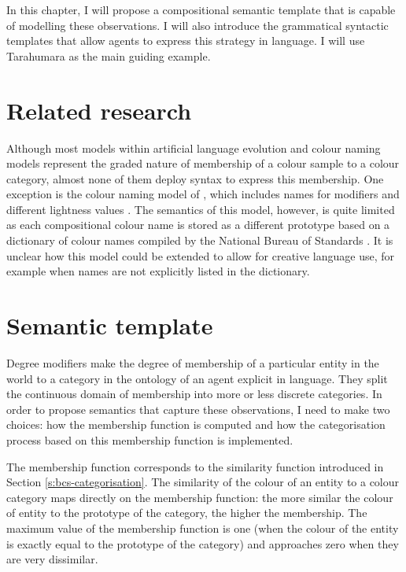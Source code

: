 In this chapter, I will propose a compositional semantic template that
is capable of modelling these observations. I will also introduce the
grammatical syntactic templates that allow agents to express this
strategy in language. I will use Tarahumara as the main guiding
example.

\section{Related research}
\label{s:gms-related-research}

Although most models within artificial language evolution and colour
naming models represent the graded nature of membership of a colour
sample to a colour category, almost none of them deploy syntax to
express this membership. One exception is the colour naming model of
\citeauthor{mojsilovic02method}, which includes names for modifiers
and different lightness values \citep{mojsilovic02method,
  mojsilovic05computational}. The semantics of this model, however, is
quite limited as each compositional colour name is stored as a
different prototype based on a dictionary of colour names compiled by
the National Bureau of Standards \citep{kelly53icss}. It is unclear
how this model could be extended to allow for creative language use,
for example when names are not explicitly listed in the dictionary.

\section{Semantic template}
\label{s:gms-semantic-template}

Degree modifiers make the degree of membership of a particular entity
in the world to a category in the ontology of an agent explicit in
language. They split the continuous domain of membership into more or
less discrete categories. In order to propose semantics that capture
these observations, I need to make two choices: how the membership
function is computed and how the categorisation process based on this
membership function is implemented.

The membership function corresponds to the similarity function
introduced in Section \ref{s:bcs-categorisation}. The similarity of
the colour of an entity to a colour category maps directly on the
membership function: the more similar the colour of entity to the
prototype of the category, the higher the membership. The maximum
value of the membership function is one (when the colour of the entity
is exactly equal to the prototype of the category) and approaches zero
when they are very dissimilar.


